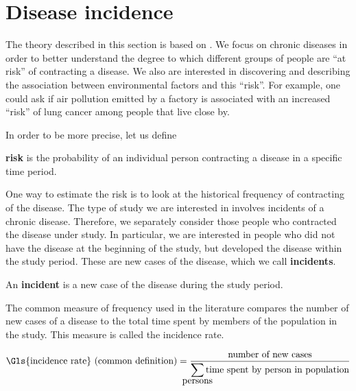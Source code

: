 

\section{Disease incidence}
\label{sec:theory:incidence}

The theory described in this section is based on \citet{rothman2008modern}.
We focus on chronic diseases in order to better understand the degree to which different groups of people are ``at risk'' of contracting a disease.
We also are interested in discovering and describing the association between environmental factors and this ``risk''.
For example, one could ask if air pollution emitted by a factory is associated with an increased ``risk'' of lung cancer among people that live close by.

In order to be more precise, let us define

\begin{defn}
    \textbf{\Gls{risk}} is the probability of an individual person contracting a disease in a specific time period.
\end{defn}

One way to estimate the \gls{risk} is to look at the historical frequency of contracting of the disease.
The type of study we are interested in involves incidents of a chronic disease.
Therefore, we separately consider those people who contracted the disease under study.
In particular, we are interested in people who did not have the disease at the beginning of the study,
but developed the disease within the study period.
These are new cases of the disease, which we call \textbf{\glspl{incident}}.

\begin{defn}
    An \textbf{\gls{incident}} is a new case of the disease during the study period.
\end{defn}

The common measure of frequency used in the literature compares the number of new cases of a disease to the total time spent by members of the population in the study.
This measure is called the \gls{incidence rate}.

\begin{equation}
    \mbox{\Gls{incidence rate} (common definition)} = \frac{\mbox{number of new cases}}
                                {\displaystyle\smashoperator{\sum\limits_{\mbox{persons}}}\mbox{time spent by person in population}}
\end{equation}

